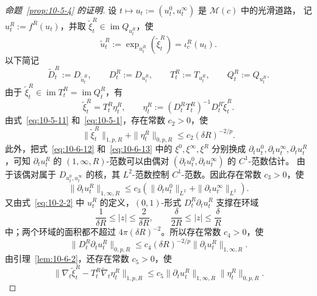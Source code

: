 \begin{proof}[命题~\ref{prop:10-5-4} 的证明]
设 $t\mapsto u_t:=(u_t^0,u_t^\infty)$ 是 $\mathcal M(c)$ 中的光滑道路，
记 $u_t^R:=f^R(u_t)$，并取
$\widetilde\xi_t^R\in\operatorname{im}Q_{u_t^R}$，使
\[
  \widetilde u_t^R:=\exp_{u_t^R}(\widetilde\xi_t^R)
  =\iota_c^R(u_t).
\]
以下简记
\[
  \widetilde D_t^R:=D_{\widetilde u_t^R},
  \qquad D_t^R:=D_{u_t^R},
  \qquad T_t^R:=T_{u_t^R},
  \qquad Q_t^R:=Q_{u_t^R}.
\]
由于 $\widetilde\xi_t^R\in\operatorname{im}T_t^R
=\operatorname{im}Q_t^R$，有
\[
  \widetilde\xi_t^R=T_t^R\eta_t^R,
  \qquad
  \eta_t^R:=(D_t^RT_t^R)^{-1}D_t^R\widetilde\xi_t^R.
\]
由式~\eqref{eq:10-5-11} 和~\eqref{eq:10-5-1}，存在常数 $c_2>0$，使
\begin{equation}\label{eq:10-6-14}
  \|\widetilde\xi_t^R\|_{1,p,R}+\|\eta_t^R\|_{0,p,R}
  \le c_2(\delta R)^{-2/p}.
\end{equation}
此外，把式~\eqref{eq:10-6-12} 和~\eqref{eq:10-6-13} 中的
$\xi^0,\xi^\infty,\xi^R$ 分别换成
$\partial_tu_t^0,\partial_tu_t^\infty,\partial_tu_t^R$，可知
$\partial_tu_t^R$ 的 $(1,\infty,R)$-范数可以由偶对
$(\partial_tu_t^0,\partial_tu_t^\infty)$ 的 $C^1$-范数估计。
由于该偶对属于 $D_{u_t^0,u_t^\infty}$ 的核，其 $L^2$-范数控制
$C^1$-范数。因此存在常数 $c_3>0$，使
\begin{equation}\label{eq:10-6-15}
  \|\partial_tu_t^R\|_{1,\infty,R}
  \le c_3\left(
    \|\partial_tu_t^0\|_{L^2}
    +\|\partial_tu_t^\infty\|_{L^2}
  \right).
\end{equation}
又由式~\eqref{eq:10-2-2} 中 $u_t^R$ 的定义，$(0,1)$-形式
$D_t^R\partial_tu_t^R$ 支撑在环域
\[
  \frac1{\delta R}\le|z|\le\frac2{\delta R},
  \qquad
  \frac\delta{2R}\le|z|\le\frac\delta R
\]
中；两个环域的面积都不超过 $4\pi(\delta R)^{-2}$。所以存在常数
$c_4>0$，使
\begin{equation}\label{eq:10-6-16}
  \|D_t^R\partial_tu_t^R\|_{0,p,R}
  \le c_4(\delta R)^{-2/p}\|\partial_tu_t^R\|_{1,\infty,R}.
\end{equation}
由引理~\ref{lem:10-6-2}，还存在常数 $c_5>0$，使
\begin{equation}\label{eq:10-6-17}
  \|\nabla_t\widetilde\xi_t^R
     -T_t^R\widetilde\nabla_t\eta_t^R\|_{1,p,R}
  \le c_5\|\partial_tu_t^R\|_{1,\infty,R}
          \|\eta_t^R\|_{0,p,R}.
\end{equation}


\end{proof}
